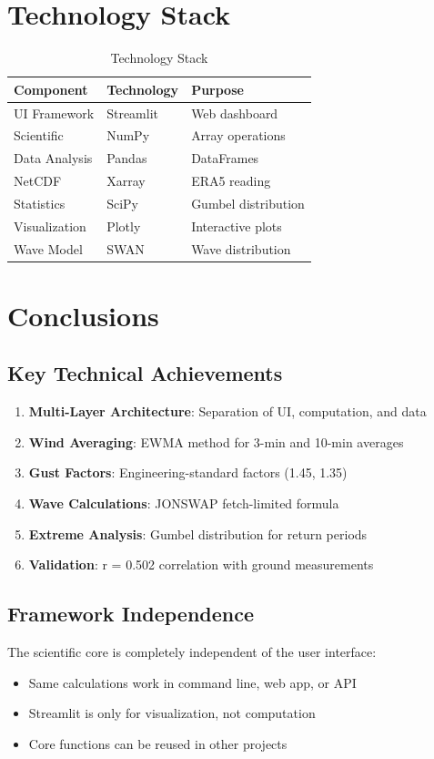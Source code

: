 \documentclass[12pt]{article}
\begin{document}
\newpage

\section{Technology Stack}

\begin{table}[h]
\centering
\begin{tabular}{|l|l|l|}
\hline
\textbf{Component} & \textbf{Technology} & \textbf{Purpose} \\
\hline
UI Framework & Streamlit & Web dashboard \\
Scientific & NumPy & Array operations \\
Data Analysis & Pandas & DataFrames \\
NetCDF & Xarray & ERA5 reading \\
Statistics & SciPy & Gumbel distribution \\
Visualization & Plotly & Interactive plots \\
Wave Model & SWAN & Wave distribution \\
\hline
\end{tabular}
\caption{Technology Stack}
\end{table}

\newpage

\section{Conclusions}

\subsection{Key Technical Achievements}

\begin{enumerate}
    \item \textbf{Multi-Layer Architecture}: Separation of UI, computation, and data
    \item \textbf{Wind Averaging}: EWMA method for 3-min and 10-min averages
    \item \textbf{Gust Factors}: Engineering-standard factors (1.45, 1.35)
    \item \textbf{Wave Calculations}: JONSWAP fetch-limited formula
    \item \textbf{Extreme Analysis}: Gumbel distribution for return periods
    \item \textbf{Validation}: r = 0.502 correlation with ground measurements
\end{enumerate}

\subsection{Framework Independence}

The scientific core is completely independent of the user interface:
\begin{itemize}
    \item Same calculations work in command line, web app, or API
    \item Streamlit is only for visualization, not computation
    \item Core functions can be reused in other projects
\end{itemize}
\end{document}
